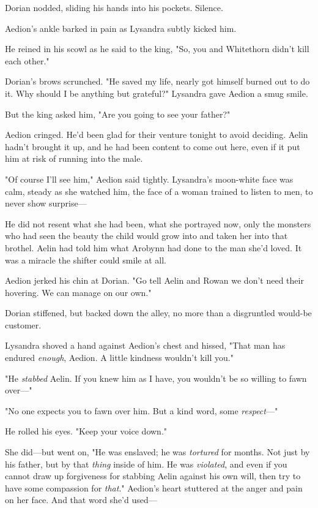 Dorian nodded, sliding his hands into his pockets.
Silence.

Aedion's ankle barked in pain as Lysandra subtly kicked him.

He reined in his scowl as he said to the king, "So, you and Whitethorn didn't kill each other."

Dorian's brows scrunched.
"He saved my life, nearly got himself burned out to do it.
Why should I be anything but grateful?"
Lysandra gave Aedion a smug smile.

But the king asked him, "Are you going to see your father?"

Aedion cringed.
He'd been glad for their venture tonight to avoid deciding.
Aelin hadn't brought it up, and he had been content to come out here, even if it put him at risk of running into the male.

"Of course I'll see him," Aedion said tightly.
Lysandra's moon-white face was calm, steady as she watched him, the face of a woman trained to listen to men, to never show surprise---

He did not resent what she had been, what she portrayed now, only the monsters who had seen the beauty the child would grow into and taken her into that brothel.
Aelin had told him what Arobynn had done to the man she'd loved.
It was a miracle the shifter could smile at all.

Aedion jerked his chin at Dorian.
"Go tell Aelin and Rowan we don't need their hovering.
We can manage on our own."

Dorian stiffened, but backed down the alley, no more than a disgruntled would-be customer.

Lysandra shoved a hand against Aedion's chest and hissed, "That man has endured \emph{enough}, Aedion.
A little kindness wouldn't kill you."

"He \emph{stabbed} Aelin.
If you knew him as I have, you wouldn't be so willing to fawn over---"

"No one expects you to fawn over him.
But a kind word, some \emph{respect}---"

He rolled his eyes.
"Keep your voice down."

She did---but went on, "He was enslaved; he was \emph{tortured} for months.
Not just by his father, but by that \emph{thing} inside of him.
He was \emph{violated}, and even if you cannot draw up forgiveness for stabbing Aelin against his own will, then try to have some compassion for \emph{that}."
Aedion's heart stuttered at the anger and pain on her face.
And that word she'd used---

